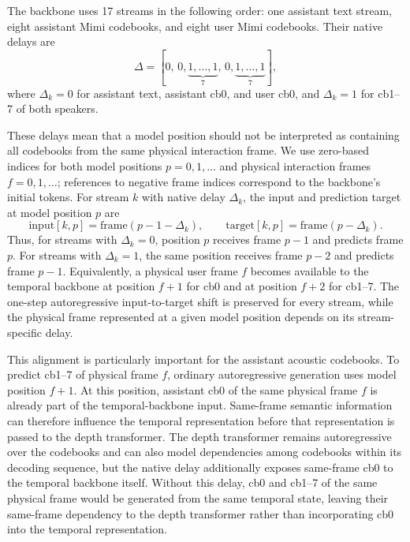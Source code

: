 The backbone uses 17 streams in the following order:
one assistant text stream, eight assistant Mimi codebooks, and eight user Mimi codebooks.
Their native delays are
\begin{equation}
\Delta =
[0,\,
0,\underbrace{1,\ldots,1}_{7},\,
0,\underbrace{1,\ldots,1}_{7}],
\label{aeq:stream_delays}
\end{equation}
where $\Delta_k=0$ for assistant text, assistant cb0, and user cb0, and $\Delta_k=1$ for cb1--7 of both speakers.

These delays mean that a model position should not be interpreted as containing all codebooks from the same physical interaction frame.
We use zero-based indices for both model positions $p=0,1,\ldots$ and physical interaction frames $f=0,1,\ldots$; references to negative frame indices correspond to the backbone's initial tokens.
For stream $k$ with native delay $\Delta_k$, the input and prediction target at model position $p$ are
\begin{equation}
\mathrm{input}[k,p]
=
\mathrm{frame}(p-1-\Delta_k),
\qquad
\mathrm{target}[k,p]
=
\mathrm{frame}(p-\Delta_k).
\label{aeq:stream_alignment}
\end{equation}
Thus, for streams with $\Delta_k=0$, position $p$ receives frame $p-1$ and predicts frame $p$.
For streams with $\Delta_k=1$, the same position receives frame $p-2$ and predicts frame $p-1$.
Equivalently, a physical user frame $f$ becomes available to the temporal backbone at position $f+1$ for cb0 and at position $f+2$ for cb1--7.
The one-step autoregressive input-to-target shift is preserved for every stream, while the physical frame represented at a given model position depends on its stream-specific delay.

This alignment is particularly important for the assistant acoustic codebooks.
To predict cb1--7 of physical frame $f$, ordinary autoregressive generation uses model position $f+1$.
At this position, assistant cb0 of the same physical frame $f$ is already part of the temporal-backbone input.
Same-frame semantic information can therefore influence the temporal representation before that representation is passed to the depth transformer.
The depth transformer remains autoregressive over the codebooks and can also model dependencies among codebooks within its decoding sequence, but the native delay additionally exposes same-frame cb0 to the temporal backbone itself.
Without this delay, cb0 and cb1--7 of the same physical frame would be generated from the same temporal state, leaving their same-frame dependency to the depth transformer rather than incorporating cb0 into the temporal representation.


